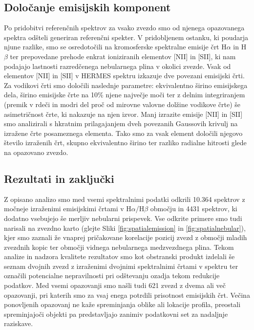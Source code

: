 \subsection{Določanje emisijskih komponent}
Po pridobitvi referenčnih spektrov za vsako zvezdo smo od njenega opazovanega spektra odšteli generiran referenčni spekter. V pridobljenem ostanku, ki poudarja njune razlike, smo se osredotočili na kromosferske spektralne emisije črt H$\alpha$ in H$\beta$ ter prepovedane prehode enkrat ioniziranih elementov [NII] in [SII], ki nam podajajo lastnosti razredčenega nebularnega plina v okolici zvezde. Vsak od elementov [NII] in [SII] v HERMES spektru izkazuje dve povezani emisijski črti. Za vodikovi črti smo določili naslednje parametre: ekvivalentno širino emisijskega dela, širino emisijske črte na 10\% njene največje moči ter z delnim integriranjem (premik v rdeči in modri del proč od mirovne valovne dolžine vodikove črte) še asimetričnost črte, ki nakazuje na njen izvor. Manj izrazite emisije [NII] in [SII] smo analizirali s hkratnim prilagajanjem dveh povezanih Gaussovih krivulj na izražene črte posameznega elementa. Tako smo za vsak element določili njegovo število izraženih črt, skupno ekvivalentno širino ter razliko radialne hitrosti glede na opazovano zvezdo.

\subsection{Rezultati in zaključki}
Z opisano analizo smo med vsemi spektralnimi podatki odkrili 10.364 spektrov z močneje izraženimi emisijskimi črtami v H$\alpha$/H$\beta$ območju in 4431 spektrov, ki dodatno vsebujejo še merljiv nebularni prispevek. Vse odkrite primere smo tudi narisali na zvezdno karto (glejte Sliki \ref{fig:spatialemission} in \ref{fig:spatialnebular}), kjer smo zaznali že vnaprej pričakovane korelacije pozicij zvezd z območji mladih zvezdnih kopic ter območji vidnega nebularnega medzvezdnega plina. Tekom analize in nadzora kvalitete rezultatov smo kot obstranski produkt izdelali še seznam dvojnih zvezd z izraženimi dvojnimi spektralnimi črtami v spektru ter označili potencialne nepravilnosti pri odštevanju ozadja tekom redukcije podatkov. Med vsemi opazovanji smo našli tudi 621 zvezd z dvema ali več opazovanji, pri katerih smo za vsaj enega potrdili prisotnost emisijskih črt. Večina ponovljenih opazovanj ne kaže spreminjanja oblike ali lokacije profila, preostali spreminjajoči objekti pa predstavljajo zanimiv podatkovni set za nadaljnje raziskave.


